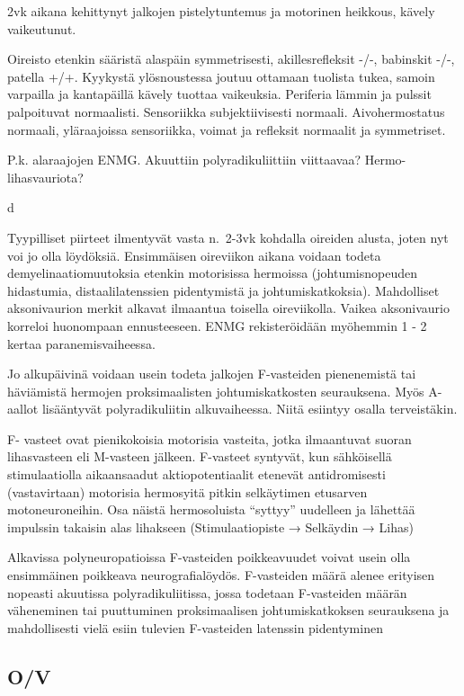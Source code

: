 \documentclass[
]{book}
\begin{document}
2vk aikana kehittynyt jalkojen pistelytuntemus ja motorinen heikkous, kävely vaikeutunut.

Oireisto etenkin sääristä alaspäin symmetrisesti, akillesrefleksit -/-, babinskit -/-, patella +/+. Kyykystä ylösnoustessa joutuu ottamaan tuolista tukea, samoin varpailla ja kantapäillä kävely tuottaa vaikeuksia. Periferia lämmin ja pulssit palpoituvat normaalisti. Sensoriikka subjektiivisesti normaali. Aivohermostatus normaali, yläraajoissa sensoriikka, voimat ja refleksit normaalit ja symmetriset.

P.k. alaraajojen ENMG. Akuuttiin polyradikuliittiin viittaavaa? Hermo-lihasvauriota?

d

Tyypilliset piirteet ilmentyvät vasta n.~2-3vk kohdalla oireiden alusta, joten nyt voi jo olla löydöksiä. Ensimmäisen oireviikon aikana voidaan todeta demyelinaatiomuutoksia etenkin motorisissa hermoissa (johtumisnopeuden hidastumia, distaalilatenssien pidentymistä ja johtumiskatkoksia). Mahdolliset aksonivaurion merkit alkavat ilmaantua toisella oireviikolla. Vaikea aksonivaurio korreloi huonompaan ennusteeseen. ENMG rekisteröidään myöhemmin 1 - 2 kertaa paranemisvaiheessa.

Jo alkupäivinä voidaan usein todeta jalkojen F-vasteiden pienenemistä tai häviämistä hermojen proksimaalisten johtumiskatkosten seurauksena. Myös A-aallot lisääntyvät polyradikuliitin alkuvaiheessa. Niitä esiintyy osalla terveistäkin.

F- vasteet ovat pienikokoisia motorisia vasteita, jotka ilmaantuvat suoran lihasvasteen eli M-vasteen jälkeen. F-vasteet syntyvät, kun sähköisellä stimulaatiolla aikaansaadut aktiopotentiaalit etenevät antidromisesti (vastavirtaan) motorisia hermosyitä pitkin selkäytimen etusarven motoneuroneihin. Osa näistä hermosoluista ``syttyy'' uudelleen ja lähettää impulssin takaisin alas lihakseen (Stimulaatiopiste → Selkäydin → Lihas)

Alkavissa polyneuropatioissa F-vasteiden poikkeavuudet voivat usein olla ensimmäinen poikkeava neurografialöydös. F-vasteiden määrä alenee erityisen nopeasti akuutissa polyradikuliitissa, jossa todetaan F-vasteiden määrän väheneminen tai puuttuminen proksimaalisen johtumiskatkoksen seurauksena ja mahdollisesti vielä esiin tulevien F-vasteiden latenssin pidentyminen

\subsection{O/V}\label{ov-11}
\end{document}
